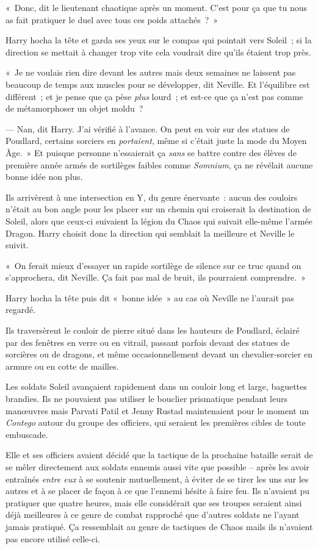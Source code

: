 «~Donc, dit le lieutenant chaotique après un moment.
C'est pour ça que tu nous as fait pratiquer le duel avec tous ces poids attachés~?~»

Harry hocha la tête et garda ses yeux sur le compas qui pointait vers Soleil~; si la direction se mettait à changer trop vite cela voudrait dire qu'ils étaient trop près.

«~Je ne voulais rien dire devant les autres mais deux semaines ne laissent pas beaucoup de temps aux muscles pour se développer, dit Neville.
Et l'équilibre est différent~; et je pense que ça pèse \emph{plus} lourd~; et est-ce que ça n'est pas comme de métamorphoser un objet moldu~?

--- Nan, dit Harry.
J'ai vérifié à l'avance.
On peut en voir sur des statues de Poudlard, certains sorciers en \emph{portaient}, même si c'était juste la mode du Moyen Âge.~»
Et puisque personne n'essaierait ça \emph{sans} se battre contre des élèves de première année armés de sortilèges faibles comme \emph{Somnium}, ça ne révélait aucune bonne idée non plus.

Ils arrivèrent à une intersection en Y, du genre énervante~: aucun des couloirs n'était au bon angle pour les placer sur un chemin qui croiserait la destination de Soleil, alors que ceux-ci suivaient la légion du Chaos qui suivait elle-même l'armée Dragon.
Harry choisit donc la direction qui semblait la meilleure et Neville le suivit.

«~On ferait mieux d'essayer un rapide sortilège de silence sur ce truc quand on s'approchera, dit Neville.
Ça fait pas mal de bruit, ils pourraient comprendre.~»

Harry hocha la tête puis dit «~bonne idée~» au cas où Neville ne l'aurait pas regardé.

Ils traversèrent le couloir de pierre situé dans les hauteurs de Poudlard, éclairé par des fenêtres en verre ou en vitrail, passant parfois devant des statues de sorcières ou de dragons, et même occasionnellement devant un chevalier-sorcier en armure ou en cotte de mailles.

\later

Les soldats Soleil avançaient rapidement dans un couloir long et large, baguettes brandies.
Ils ne pouvaient pas utiliser le bouclier prismatique pendant leurs manœuvres mais Parvati Patil et Jenny Rustad maintenaient pour le moment un \emph{Contego} autour du groupe des officiers, qui seraient les premières cibles de toute embuscade.

Elle et ses officiers avaient décidé que la tactique de la prochaine bataille serait de se mêler directement aux soldats ennemis aussi vite que possible -- après les avoir entraînés \emph{entre eux} à se soutenir mutuellement, à éviter de se tirer les uns sur les autres et à se placer de façon à ce que l'ennemi hésite à faire feu.
Ils n'avaient pu pratiquer que quatre heures, mais elle considérait que ses troupes seraient ainsi déjà meilleures à ce genre de combat rapproché que d'autres soldats ne l'ayant jamais pratiqué.
Ça ressemblait au genre de tactiques de Chaos mails ils n'avaient pas encore utilisé celle-ci.

